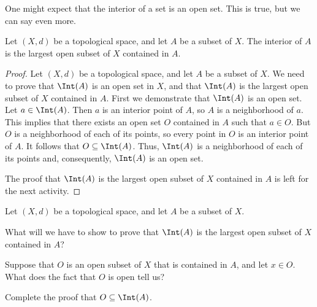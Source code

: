 One might expect that the interior of a set is an open set. This is true, but we can say even more. 



\begin{theorem} \label{thm:TS_Interior} Let $(X,d)$ be a topological space, and let $A$ be a subset of $X$. The interior of $A$ is the largest open subset of $X$ contained in $A$.  
\end{theorem}

\begin{proof} Let $(X,d)$ be a topological space, and let $A$ be a subset of $X$. We need to prove that $\Int(A)$ is an open set in $X$, and that $\Int(A)$ is the largest open subset of $X$ contained in $A$. First we demonstrate that $\Int(A)$ is an open set. Let $a \in \Int(A)$. Then $a$ is an interior point of $A$, so $A$ is a neighborhood of $a$. This implies that there exists an open set $O$ contained in $A$ such that $a \in O$. But $O$ is a neighborhood of each of its points, so every point in $O$ is an interior point of $A$. It follows that $O \subseteq \Int(A)$. Thus, $\Int(A)$ is a neighborhood of each of its points and, consequently, $\Int(A)$ is an open set. 

The proof that $\Int(A)$ is the largest open subset of $X$ contained in $A$ is left for the next activity.
\end{proof}



\begin{activity} Let $(X,d)$ be a topological space, and let $A$ be a subset of $X$. 
\ba
\item What will we have to show to prove that $\Int(A)$ is the largest open subset of $X$ contained in $A$?



\item Suppose that $O$ is an open subset of $X$ that is contained in $A$, and let $x \in O$. What does the fact that $O$ is open tell us?



\item Complete the proof that $O \subseteq \Int(A)$.



\begin{comment}

We need to prove that any open subset of $X$ that is contained in $A$ is a subset of $\Int(A)$. Suppose that $O$ is an open subset of $X$ that is contained in $A$. Let $x \in O$. Then $O$ is a neighborhood of $x$ and so $x \in \Int(A)$. Therefore, $O \subseteq \Int(A)$ and $\Int(A)$ is the largest open subset of $X$ contained in $A$. 
\end{comment}

\ea

\end{activity}



